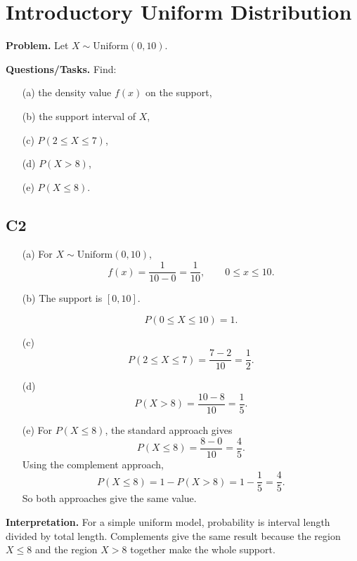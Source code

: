 \section{Introductory Uniform Distribution}
	
\textbf{Problem.}
Let $X\sim \text{Uniform}(0,10)$.

\textbf{Questions/Tasks.}
Find:
\begin{itemize}
	\item[(a)] the density value $f(x)$ on the support,
	\item[(b)] the support interval of $X$,
	\item[(c)] $P(2\le X\le 7)$,
	\item[(d)] $P(X>8)$,
	\item[(e)] $P(X\le 8)$.
\end{itemize}

\subsection*{C2}
\begin{itemize}
	\item[(a)] For $X\sim \text{Uniform}(0,10)$,
	\[
	f(x)=\frac{1}{10-0}=\frac{1}{10},\qquad 0\le x\le 10.
	\]
	
	\item[(b)] The support is $[0,10]$.
	
	\[
	P(0\le X\le 10)=1.
	\]
	
	
	\item[(c)]
	\[
	P(2\le X\le 7)=\frac{7-2}{10}=\frac{1}{2}.
	\]
	
	
	\item[(d)]
	\[
	P(X>8)=\frac{10-8}{10}=\frac{1}{5}.
	\]
	
	
	\item[(e)] For $P(X\le 8)$, the standard approach gives
	\[
	P(X\le 8)=\frac{8-0}{10}=\frac{4}{5}.
	\]
	Using the complement approach,
	\[
	P(X\le 8)=1-P(X>8)=1-\frac{1}{5}=\frac{4}{5}.
	\]
	So both approaches give the same value.
	
\end{itemize}

\textbf{Interpretation.}
For a simple uniform model, probability is interval length divided by total length. Complements give the same result because the region $X\le 8$ and the region $X>8$ together make the whole support.

